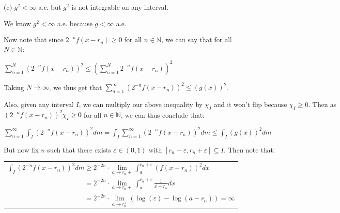 \documentclass{book}
\newcommand{\myComment}{%
   \color{RawerSienna}%
   \fontsize{12}{14}\selectfont%
}
\newcommand{\exTwoP}{%
   \color{RedViolet}%
   \fontsize{13}{15}\selectfont%
}
\newenvironment{myIndent}{%
   \begin{adjustwidth}{2.5em}{0em}%
}{%
   \end{adjustwidth}%
}
\newenvironment{myTindent}{%
   \begin{adjustwidth}{7.5em}{0em}%
}{%
   \end{adjustwidth}%
}
\newcommand{\retTwo}{\hfill\bigbreak}
\begin{document}
\begin{enumerate}
\begin{myIndent}
      
      \begin{myTindent}\myComment
         We haven't defined continuity yet for when $g$ can equal $\infty$ on an interval. But here's my current intuition on what being continuous at $x$ when $g(x)  = \infty$ should mean.
      \end{myTindent}
      Finally if $g(x) = \infty$, then by the previous reasoning, even if we modify $g$ on a null set, we can still find $s$ in any neighborhood of $x$ such that $g(s) < \infty$. Thus, $g$ is not continuous at $x$.\retTwo
   \end{myIndent}

   \item[(c)] $g^2 < \infty$ a.e. but $g^2$ is not integrable on any interval.  

   \begin{myIndent}\exTwoP
      We know $g^2 < \infty$ a.e. because $g < \infty$ a.e.\retTwo

      Now note that since $2^{-n}f(x - r_n) \geq 0$ for all $n \in \mathbb{N}$, we can say that for all\\ $N \in \mathbb{N}$:\\ [-20pt]

      {\centering $\sum\limits_{n = 1}^N (2^{-n}f(x - r_n))^2 \leq \left(\sum\limits_{n = 1}^N 2^{-n}f(x - r_n)\right)^2$ \retTwo\par}

      Taking $N \rightarrow \infty$, we thus get that $\sum\limits_{n = 1}^\infty (2^{-n}f(x - r_n))^2 \leq (g(x))^2$.\retTwo

      Also, given any interval $I$, we can multiply our above inequality by $\chi_I$ and it won't flip because $\chi_I \geq 0$. Then as $(2^{-n}f(x - r_n))^2\chi_I \geq 0$ for all $n \in \mathbb{N}$, we can thus conclude that:

      {\centering $\sum\limits_{n = 1}^\infty \int_I (2^{-n}f(x - r_n))^2dm = \int_I \sum\limits_{n = 1}^\infty (2^{-n}f(x - r_n))^2 dm \leq \int_I (g(x))^2dm$\retTwo\par}

      But now fix $n$ such that there exists $\varepsilon \in (0, 1)$ with $[r_n - \varepsilon, r_n + \varepsilon] \subseteq I$. Then note that:

      {\centering 
      \begin{tabular}{l}
         $\int_I (2^{-n}f(x - r_n))^2 dm \geq 2^{-2n}\cdot \lim\limits_{a \rightarrow r_n+}\int_{a}^{r_n + \varepsilon} (f(x - r_n))^2dx$ \\
         $\phantom{\int_I (2^{-n}f(x - r_n))^2 dm} = 2^{-2n} \cdot \lim\limits_{a \rightarrow r_n+}\int_{a}^{r_n + \varepsilon} \frac{1}{x - r_n}dx$\\
         $\phantom{\int_I (2^{-n}f(x - r_n))^2 dm} = 2^{-2n}\cdot\lim\limits_{a \rightarrow r_n^+}(\log(\varepsilon) - \log(a - r_n)) = \infty$
      \end{tabular} \newpage\par}
      

\end{myIndent}
\end{enumerate}
\end{document}
